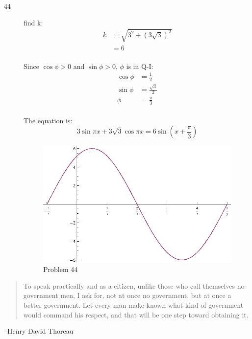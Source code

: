 \documentclass{exam}
\begin{document}
\begin{description}
      \item[44] 
        find k:
        \begin{align*}
          k & = \sqrt{3^2 + (3 \sqrt{3})^2} \\
            & = 6 \\
        \end{align*}

        Since $\cos \phi > 0$ and $\sin \phi > 0$, $\phi$ is in Q-I:
        \begin{align*}
          \cos \phi & = \frac{1}{2} \\
          \sin \phi & = \frac{\sqrt{3}}{2} \\
          \phi      & = \frac{\pi}{3} \\
        \end{align*}

        The equation is:
        \[
          3 \sin \pi x + 3 \sqrt{3} \cos \pi x = \boxed{6 \sin \left( x + \frac{\pi}{3} \right)} 
        \]

        \begin{figure}[H]
          \centering
          \includegraphics[scale=0.8]{problem44.eps}
          \caption{Problem 44}
        \end{figure}

    \end{description}

  \else
    \vspace{8 cm}

    \begin{quote}
      \begin{em}
	To speak practically and as a citizen, unlike those who call themselves
	no-government men, I ask for, not at once no government, but at once a better
	government. Let every man make known what kind of government would command his
	respect, and that will be one step toward obtaining it.     
      \end{em}
    \end{quote}
    \hspace{1 cm} --Henry David Thoreau
  \fi
\end{document}
